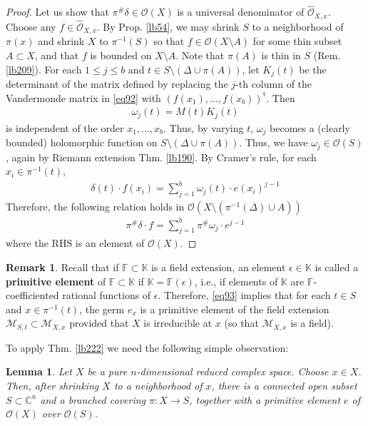 \documentclass[12pt,b5paper,notitlepage]{report}
\theoremstyle{definition}
\newtheorem{rem}[df]{Remark}
\theoremstyle{plain}
\newtheorem{lm}[df]{Lemma}
\newcommand{\tr}{\mathrm{t}} %
\newcommand{\scr}{\mathscr}
\newcommand{\Kbb}{\mathbb K}
\newcommand{\Cbb}{\mathbb C}
\newcommand{\Owht}{\widehat{\scr O}}
\newcommand{\Fbb}{\mathbb F}
\numberwithin{equation}{section}
\begin{document}
\begin{proof}
Let us show that $\pi^\#\delta\in\scr O(X)$ is a universal denominator of $\Owht_{X,x}$. Choose any $f\in\Owht_{X,x}$. By Prop. \ref{lb54}, we may shrink $S$ to a neighborhood of $\pi(x)$ and shrink $X$ to $\pi^{-1}(S)$ so that $f\in \scr O(X\setminus A)$ for some thin subset $A\subset X$, and that $f$ is bounded on $X\setminus A$. Note that $\pi(A)$ is thin in $S$ (Rem. \ref{lb209}). For each $1\leq j\leq b$ and $t\in S\setminus(\Delta\cup \pi(A))$, let $K_j(t)$ be the determinant of the matrix defined by replacing the $j$-th column of the Vandermonde matrix in \eqref{eq92} with $(f(x_1),\dots,f(x_b))^\tr$. Then
\begin{align}
\omega_j(t)=M(t)K_j(t) \label{eq95}
\end{align}
is independent of the order $x_1,\dots,x_b$. Thus, by varying $t$, $\omega_j$ becomes a (clearly bounded) holomorphic function on $S\setminus(\Delta\cup\pi(A))$. Thus, we have $\omega_j\in\scr O(S)$, again by Riemann extension Thm. \ref{lb190}. By Cramer's rule, for each $x_i\in\pi^{-1}(t)$,
\begin{align*} 
\delta(t)\cdot f(x_i)=\sum_{j=1}^{b}\omega_j(t)\cdot e(x_i)^{j-1}
\end{align*}
Therefore, the following relation holds in $\scr O(X\setminus(\pi^{-1}(\Delta)\cup A))$
\begin{align}
\pi^\#\delta\cdot f=\sum_{j=1}^b\pi^\#\omega_j\cdot e^{j-1} \label{eq93}
\end{align}
where the RHS is an element of $\scr O(X)$.
\end{proof}


\begin{rem}
Recall that if $\Fbb\subset\Kbb$ is a field extension, an element $\epsilon\in\Kbb$ is called a \textbf{primitive element} of $\Fbb\subset\Kbb$ if $\Kbb=\Fbb(\epsilon)$, i.e., if elements of $\Kbb$ are $\Fbb$-coefficiented rational functions of $\epsilon$. Therefore, \eqref{eq93} implies that for each $t\in S$ and $x\in\pi^{-1}(t)$, the germ $e_x$ is a primitive element of the field extension $\scr M_{S,t}\subset\scr M_{X,x}$ provided that $X$ is irreducible at $x$ (so that $\scr M_{X,x}$ is a field).
\end{rem}


To apply Thm. \ref{lb222} we need the following simple observation:

\begin{lm}\label{lb364}
Let $X$ be a pure $n$-dimensional reduced complex space. Choose $x\in X$. Then, after shrinking $X$ to a neighborhood of $x$, there is a connected open subset $S\subset\Cbb^n$ and a branched covering $\pi:X\rightarrow S$, together with a primitive element $e$ of $\scr O(X)$ over $\scr O(S)$.
\end{lm}
\end{document}

